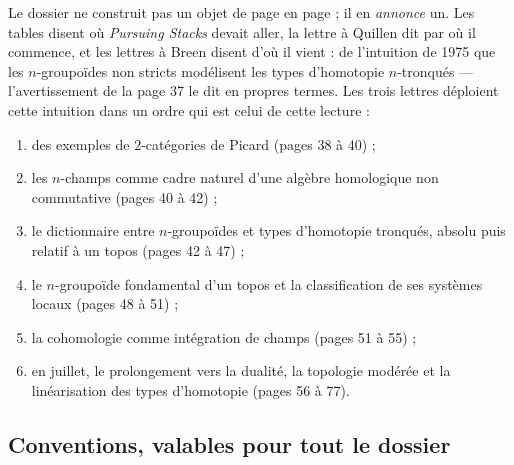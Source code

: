 \documentclass[11pt,a4paper]{article}
\begin{document}
Le dossier ne construit pas un objet de page en page ; il en \emph{annonce}
un. Les tables disent où \emph{Pursuing Stacks} devait aller, la lettre à
Quillen dit par où il commence, et les lettres à Breen disent d'où il vient :
de l'intuition de 1975 que les $n$-groupoïdes non stricts modélisent les types
d'homotopie $n$-tronqués --- l'avertissement de la page 37 le dit en propres
termes. Les trois lettres déploient cette intuition dans un ordre qui est
celui de cette lecture :
\begin{enumerate}
  \item des exemples de $2$-catégories de Picard (pages 38 à 40) ;
  \item les $n$-champs comme cadre naturel d'une algèbre homologique non
  commutative (pages 40 à 42) ;
  \item le dictionnaire entre $n$-groupoïdes et types d'homotopie tronqués,
  absolu puis relatif à un topos (pages 42 à 47) ;
  \item le $n$-groupoïde fondamental d'un topos et la classification de ses
  systèmes locaux (pages 48 à 51) ;
  \item la cohomologie comme intégration de champs (pages 51 à 55) ;
  \item en juillet, le prolongement vers la dualité, la topologie modérée et
  la linéarisation des types d'homotopie (pages 56 à 77).
\end{enumerate}

\subsection*{Conventions, valables pour tout le dossier}
\end{document}
